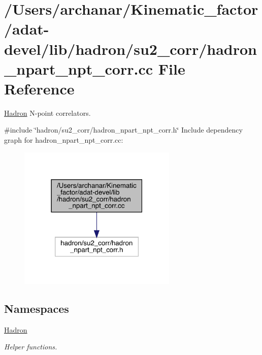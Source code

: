\hypertarget{adat-devel_2lib_2hadron_2su2__corr_2hadron__npart__npt__corr_8cc}{}\section{/\+Users/archanar/\+Kinematic\+\_\+factor/adat-\/devel/lib/hadron/su2\+\_\+corr/hadron\+\_\+npart\+\_\+npt\+\_\+corr.cc File Reference}
\label{adat-devel_2lib_2hadron_2su2__corr_2hadron__npart__npt__corr_8cc}


\mbox{\hyperlink{namespaceHadron}{Hadron}} N-\/point correlators.  


{\ttfamily \#include \char`\"{}hadron/su2\+\_\+corr/hadron\+\_\+npart\+\_\+npt\+\_\+corr.\+h\char`\"{}}\newline
Include dependency graph for hadron\+\_\+npart\+\_\+npt\+\_\+corr.\+cc\+:
\nopagebreak
\begin{figure}[H]
\begin{center}
\leavevmode
\includegraphics[width=214pt]{dd/d54/adat-devel_2lib_2hadron_2su2__corr_2hadron__npart__npt__corr_8cc__incl}
\end{center}
\end{figure}
\subsection*{Namespaces}
\begin{DoxyCompactItemize}
\item 
 \mbox{\hyperlink{namespaceHadron}{Hadron}}
\begin{DoxyCompactList}\small\item\em Helper functions. \end{DoxyCompactList}\end{DoxyCompactItemize}
